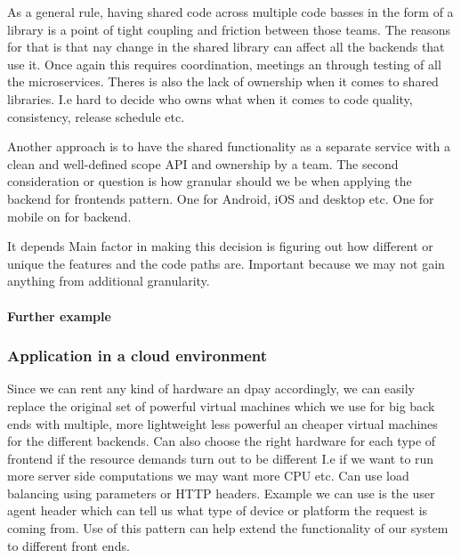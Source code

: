 As a general rule, having shared code across multiple code basses in the form of a library is a point of tight coupling and friction between those teams.
The reasons for that is that nay change in the shared library can affect all the backends that use it.
Once again this requires coordination, meetings an through testing of all the microservices.
Theres is also the lack of ownership when it comes to shared libraries.
I.e hard to decide who owns what when it comes to code quality, consistency, release schedule etc.

Another approach is to have the shared functionality as a separate service with a clean and well-defined scope API and ownership by a team.
The second consideration or question is how granular should we be when applying the backend for frontends pattern.
One for Android, iOS and desktop etc. One for mobile on for backend.

It depends
Main factor in making this decision is figuring out how different or unique the features and the code paths are.
Important because we may not gain anything from additional granularity.

\paragraph{Further example}

\subsubsection{Application in a cloud environment}
Since we can rent any kind of hardware an dpay accordingly, we can easily replace the original set of powerful virtual machines which we use for big back ends with multiple, more lightweight less powerful an cheaper virtual machines for the different backends.
Can also choose the right hardware for each type of frontend if the resource demands turn out to be different
I.e if we want to run more server side computations we may want more CPU etc.
Can use load balancing using parameters or HTTP headers.
Example we can use is the user agent header which can tell us what type of device or platform the request is coming from.
Use of this pattern can help extend the functionality of our system to different front ends.